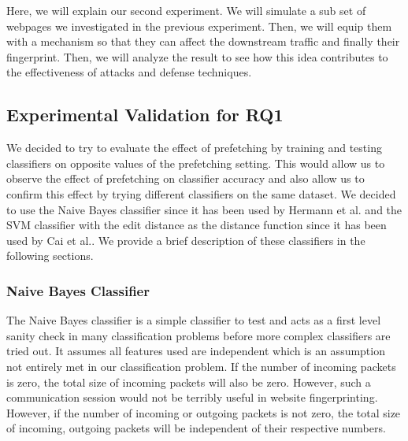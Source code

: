 Here, we will explain our second experiment. We will simulate a sub set of webpages we investigated in the previous experiment. Then, we will equip them with a mechanism so that they can affect the downstream traffic and finally their fingerprint. Then, we will analyze the result to see how this idea contributes to the effectiveness of attacks and defense techniques.

\subsection{Experimental Validation for RQ1}
We decided to try to evaluate the effect of prefetching by training and testing classifiers on opposite values of the prefetching setting. 
This would allow us to observe the effect of prefetching on classifier accuracy and also allow us to confirm this effect by trying different classifiers on the same dataset.
We decided to use the Naive Bayes classifier since it has been used by Hermann et al.\cite{hermann} and the SVM classifier with the edit distance as the distance function since it has been used by Cai et al.\cite{cai2012touching}. We provide a brief description of these classifiers in the following sections.

\subsubsection{Naive Bayes Classifier} 
The Naive Bayes classifier is a simple classifier to test and acts as a first level sanity check in many classification problems before more complex classifiers are tried out. 
It assumes all features used are independent which is an assumption not entirely met in our classification problem. 
If the number of incoming packets is zero, the total size of incoming packets will also be zero.
However, such a communication session would not be terribly useful in website fingerprinting.
However, if the number of incoming or outgoing packets is not zero, the total size of incoming, outgoing packets will be independent of their respective numbers.

